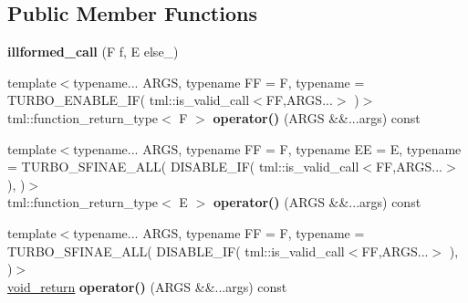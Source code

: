 \subsection*{Public Member Functions}
\begin{DoxyCompactItemize}
\item 
\hypertarget{structtml_1_1runtime_1_1illformed__call_a14d3576d333931e364d0717a5c438d69}{{\bfseries illformed\+\_\+call} (F f, E else\+\_\+)}\label{structtml_1_1runtime_1_1illformed__call_a14d3576d333931e364d0717a5c438d69}

\item 
\hypertarget{structtml_1_1runtime_1_1illformed__call_a52f1eca7b1c4be18fc23d7affe031c80}{{\footnotesize template$<$typename... A\+R\+G\+S, typename F\+F  = F, typename  = T\+U\+R\+B\+O\+\_\+\+E\+N\+A\+B\+L\+E\+\_\+\+I\+F( tml\+::is\+\_\+valid\+\_\+call$<$\+F\+F,\+A\+R\+G\+S...$>$ )$>$ }\\tml\+::function\+\_\+return\+\_\+type$<$ F $>$ {\bfseries operator()} (A\+R\+G\+S \&\&...args) const }\label{structtml_1_1runtime_1_1illformed__call_a52f1eca7b1c4be18fc23d7affe031c80}

\item 
\hypertarget{structtml_1_1runtime_1_1illformed__call_ae131466cf178fabdecf582c2b2ee05e9}{{\footnotesize template$<$typename... A\+R\+G\+S, typename F\+F  = F, typename E\+E  = E, typename  = T\+U\+R\+B\+O\+\_\+\+S\+F\+I\+N\+A\+E\+\_\+\+A\+L\+L( D\+I\+S\+A\+B\+L\+E\+\_\+\+I\+F( tml\+::is\+\_\+valid\+\_\+call$<$\+F\+F,\+A\+R\+G\+S...$>$ ),                                                )$>$ }\\tml\+::function\+\_\+return\+\_\+type$<$ E $>$ {\bfseries operator()} (A\+R\+G\+S \&\&...args) const }\label{structtml_1_1runtime_1_1illformed__call_ae131466cf178fabdecf582c2b2ee05e9}

\item 
\hypertarget{structtml_1_1runtime_1_1illformed__call_a57742c7d8ed5cfc900bfa3d54d4df8e5}{{\footnotesize template$<$typename... A\+R\+G\+S, typename F\+F  = F, typename  = T\+U\+R\+B\+O\+\_\+\+S\+F\+I\+N\+A\+E\+\_\+\+A\+L\+L( D\+I\+S\+A\+B\+L\+E\+\_\+\+I\+F( tml\+::is\+\_\+valid\+\_\+call$<$\+F\+F,\+A\+R\+G\+S...$>$ ),                                                                                     )$>$ }\\\hyperlink{structtml_1_1runtime_1_1illformed__call_1_1void__return}{void\+\_\+return} {\bfseries operator()} (A\+R\+G\+S \&\&...args) const }\label{structtml_1_1runtime_1_1illformed__call_a57742c7d8ed5cfc900bfa3d54d4df8e5}

\end{DoxyCompactItemize}


